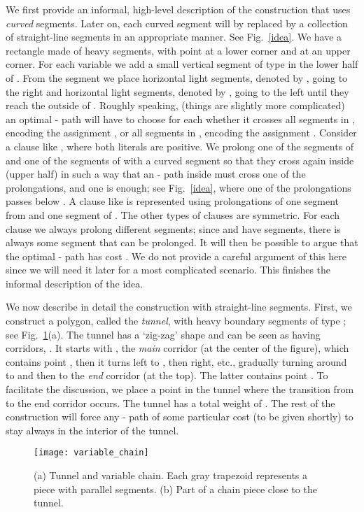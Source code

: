 \documentclass[11pt,a4paper]{article}
\begin{document}
We first provide an informal, high-level description of the construction that uses \emph{curved} segments. Later on, each curved segment will by replaced by a collection of straight-line segments in an appropriate manner. See Fig.~\ref{idea}. We have a rectangle  made of heavy segments, with point  at a lower corner and  at an upper corner. For each variable  we add a small vertical segment of type  in the lower half of .
From the segment we place  horizontal light segments, denoted by , going to the right and  horizontal light segments, denoted by , going to the left until they reach the outside of . Roughly speaking, (things are slightly more complicated)
an optimal - path will have to choose for each  whether it crosses all segments in , encoding the assignment , or all segments in , encoding the assignment .
Consider a clause like , where both literals are positive.  We prolong one of the segments of  and one of the segments of  with a curved segment so that they cross again inside  (upper half) in such a way that an - path inside  must cross one of the prolongations, and one is enough; see Fig.~\ref{idea}, where one of the prolongations passes below . A clause like  is represented using prolongations of one segment from  and one segment of . The other types of clauses are symmetric. For each clause we always prolong different segments; since  and  have  segments, there is always some segment that can be prolonged. It will then be possible to argue that the optimal - path has cost . 
We do not provide a careful argument of this here since we will need it later for a most complicated scenario. This finishes the informal description of the idea.

We now describe in detail the construction with straight-line segments.
First, we construct a polygon, called the \emph{tunnel}, with heavy boundary segments of type ; see Fig.~\ref{chain}(a).  
The tunnel has a `zig-zag' shape and can be seen as having  corridors, . It starts with ,  the \emph{main} corridor (at the center of the figure), which contains point , then it turns left to  , then right, etc., gradually turning around to  and then to the \emph{end} corridor  (at the top). The latter contains point . To facilitate the discussion, we place a point  in the tunnel where the transition from  to the end corridor occurs. 
The tunnel has a total weight of .
The rest of the construction will force any - path of some particular cost (to be given shortly) to stay always in the interior of the tunnel. 

\begin{figure}
\centering
\texttt{[image: variable\_chain]}
\caption{(a) Tunnel and variable chain. Each gray trapezoid represents a piece with  parallel segments. (b) Part of a chain piece close to the tunnel.}
\label{chain}
\end{figure}
\end{document}
